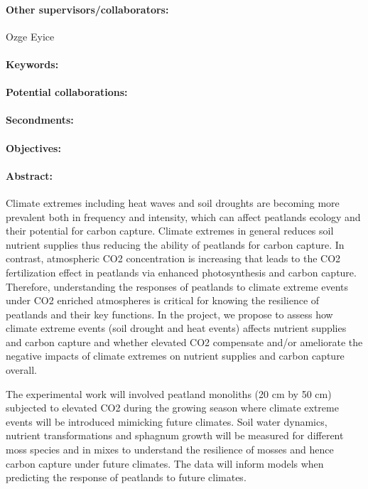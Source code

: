 \documentclass[12pt]{article}
\begin{document}
\paragraph{Other supervisors/collaborators:} Ozge Eyice
\paragraph{Keywords:} 
\paragraph{Potential collaborations:} 
\paragraph{Secondments:} 
\paragraph{Objectives:} 
\paragraph{Abstract:} Climate extremes including heat waves and soil droughts are becoming more prevalent both in frequency and intensity, which can affect peatlands ecology and their potential for carbon capture. Climate extremes in general reduces soil nutrient supplies thus reducing the ability of peatlands for carbon capture. In contrast, atmospheric CO2 concentration is increasing that leads to the CO2 fertilization effect in peatlands via enhanced photosynthesis and carbon capture. Therefore, understanding the responses of peatlands to climate extreme events under CO2 enriched atmospheres is critical for knowing the resilience of peatlands and their key functions. In the project, we propose to assess how climate extreme events (soil drought and heat events) affects nutrient supplies and carbon capture and whether elevated CO2 compensate and/or ameliorate the negative impacts of climate extremes on nutrient supplies and carbon capture overall. 

The experimental work will involved peatland monoliths (20 cm by 50 cm) subjected to elevated CO2 during the growing season where climate extreme events will be introduced mimicking future climates. Soil water dynamics, nutrient transformations and sphagnum growth will be measured for different moss species and in mixes to understand the resilience of mosses and hence carbon capture under future climates. The data will inform models when predicting the response of peatlands to future climates.
\end{document}
